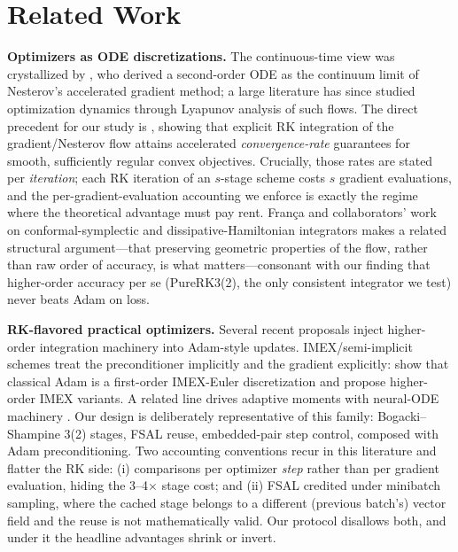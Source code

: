 \documentclass{article}
\begin{document}
\section{Related Work}
\label{sec:related}

\textbf{Optimizers as ODE discretizations.} The continuous-time view was crystallized by \citet{su2016differential}, who derived a second-order ODE as the continuum limit of Nesterov's accelerated gradient method; a large literature has since studied optimization dynamics through Lyapunov analysis of such flows. The direct precedent for our study is \citet{zhang2018direct}, showing that explicit RK integration of the gradient/Nesterov flow attains accelerated \emph{convergence-rate} guarantees for smooth, sufficiently regular convex objectives. Crucially, those rates are stated per \emph{iteration}; each RK iteration of an $s$-stage scheme costs $s$ gradient evaluations, and the per-gradient-evaluation accounting we enforce is exactly the regime where the theoretical advantage must pay rent. Fran\c{c}a and collaborators' work on conformal-symplectic and dissipative-Hamiltonian integrators \cite{franca2020conformal,franca2021dissipative} makes a related structural argument---that preserving geometric properties of the flow, rather than raw order of accuracy, is what matters---consonant with our finding that higher-order accuracy per se (PureRK3(2), the only consistent integrator we test) never beats Adam on loss.

\textbf{RK-flavored practical optimizers.} Several recent proposals inject higher-order integration machinery into Adam-style updates. IMEX/semi-implicit schemes treat the preconditioner implicitly and the gradient explicitly: \citet{bhattacharjee2024imex} show that classical Adam is a first-order IMEX-Euler discretization and propose higher-order IMEX variants. A related line drives adaptive moments with neural-ODE machinery \cite{cho2022adamnodes}. Our design is deliberately representative of this family: Bogacki--Shampine 3(2) stages, FSAL reuse, embedded-pair step control, composed with Adam preconditioning. Two accounting conventions recur in this literature and flatter the RK side: (i) comparisons per optimizer \emph{step} rather than per gradient evaluation, hiding the 3--4$\times$ stage cost; and (ii) FSAL credited under minibatch sampling, where the cached stage belongs to a different (previous batch's) vector field and the reuse is not mathematically valid. Our protocol disallows both, and under it the headline advantages shrink or invert.
\end{document}
